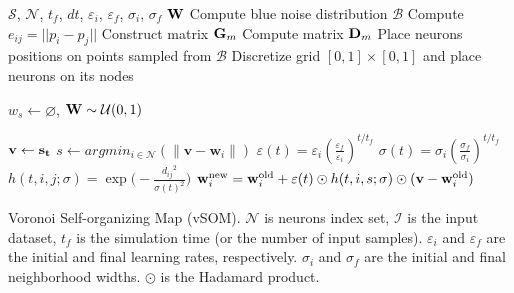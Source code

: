 \begin{algorithm}[!htpb]
	\begin{algorithmic}
    	\Require $\mathcal{S}$, $\mathcal{N}$, $t_f$, $dt$, $\varepsilon_i$, $\varepsilon_f$, $\sigma_i$, $\sigma_f$
        \Ensure ${\bf W}$
        	\State Compute blue noise distribution $\mathcal{B}$
        	\State Compute $e_{ij} = || p_i - p_j ||$		
        	\State Construct matrix ${\bf G}_m$			
        	\State Compute matrix ${\bf D}_m$			
        	\State Place neurons positions on points sampled from $\mathcal{B}$
        \Else
        	\State Discretize grid $[0, 1]\times[0, 1]$ and place neurons on its nodes
        \EndIf
        
        \State $w_s \gets \varnothing$, ${\bf W} \sim \mathcal{U}(0, 1)$	
                 
        	\State ${\bf v} \gets \bf{s}_t $	
        	\State $s \gets argmin_{i \in \mathcal{N}} (\lVert \mathbf{v} - \mathbf{w}_i \rVert)$
        	\State $\varepsilon(t) = \varepsilon_i\left(\frac{\varepsilon_f}{\varepsilon_i}\right)^{t/t_f}$
        	\State $\sigma(t) = \sigma_i\left(\frac{\sigma_f}{\sigma_i}\right)^{t/t_f}$
        	\State $h(t,i,j; \sigma) = \exp\Big(-\frac{{d_{ij}}^2}{\sigma(t)^2}\Big)$
        	\State ${\bf w}_i^{\text{new}} = {\bf w}_i^{\text{old}} + \varepsilon(t) \odot h(t,i,s;\sigma) \odot (\mathbf{v} - \mathbf{w}_i^{\text{old}})$
        \EndFor
	\end{algorithmic}
\caption{Voronoi Self-organizing Map (vSOM). $\mathcal{N}$ is neurons index set,
$\mathcal{I}$ is the input dataset, $t_f$ is the simulation time (or the number of input samples).
$\varepsilon_i$ and $\varepsilon_f$ are the initial and final learning rates,
respectively. $\sigma_i$ and $\sigma_f$ are the initial and final neighborhood
widths. $\odot$ is the Hadamard product.}
\label{algo:vsom}
\end{algorithm}
